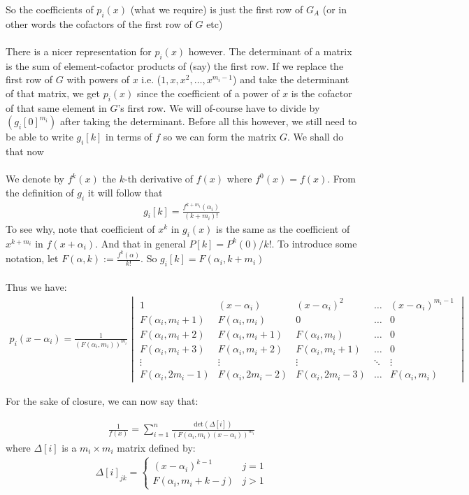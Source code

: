 \documentclass{article}
\begin{document}
So the coefficients of $p_i(x)$ (what we require) is just the first row of $G_A$ (or in other words the cofactors of the first row of $G$ etc) 
\\\\
There is a nicer representation for $p_i(x)$ however. The determinant of a matrix is the sum of element-cofactor products of (say) the first row. If we replace the first row of $G$ with powers of $x$ i.e. ($1,x,x^2,\dots,x^{m_i-1}$) and take the determinant of that matrix, we get $p_i(x)$ since the coefficient of a power of $x$ is the cofactor of that same element in $G$'s first row. We will of-course have to divide by $(g_i[0]^{m_i})$ after taking the determinant. Before all this however, we still need to be able to write $g_i[k]$ in terms of $f$ so we can form the matrix $G$. We shall do that now
\\\\
We denote by $f^k(x)$ the $k$-th derivative of $f(x)$ where $f^0(x) = f(x)$. From the definition of $g_i$ it will follow that
\begin{align}
    g_i[k] = \frac{f^{k+m_i}(\alpha_i)}{(k+m_i)!}
\end{align}
To see why, note that coefficient of $x^k$ in $g_i(x)$ is the same as the coefficient of $x^{k+m_i}$ in $f(x+\alpha_i)$. And that in general $P[k] = P^k(0)/k!$. To introduce some notation, let $F(\alpha, k) := \frac{f^k(\alpha)}{k!}$. So $g_i[k] = F(\alpha_i, k+m_i)$
\\\\
Thus we have:
\begin{align}
    p_i(x-\alpha_i) = \frac{1}{(F(\alpha_i, m_i))^{m_i}}\begin{vmatrix}
    1 & (x-\alpha_i) & (x-\alpha_i)^2 &  \dots  & (x-\alpha_i)^{m_i-1} \\
    F(\alpha_i, m_i+1) & F(\alpha_i, m_i) & 0 &\dots  & 0 \\
    F(\alpha_i, m_i+2) & F(\alpha_i, m_i+1) & F(\alpha_i, m_i) & \dots  & 0 \\
    F(\alpha_i, m_i+3) & F(\alpha_i, m_i+2) & F(\alpha_i, m_i+1)  & \dots  & 0 \\
    \vdots & \vdots & \vdots & \ddots & \vdots \\
    F(\alpha_i, 2 m_i-1) & F(\alpha_i, 2 m_i-2) & F(\alpha_i, 2 m_i-3) & \dots  & F(\alpha_i, m_i)
\end{vmatrix}
\end{align}

For the sake of closure, we can now say that:
\begin{tcolorbox}
\begin{align}
    \frac{1}{f(x)} = \sum_{i=1}^{n} \frac{\textrm{det}(\Delta[i])}{\left(F(\alpha_i, m_i)(x-\alpha_i)\right)^{m_i}} \label{repeated}
\end{align}
where $\Delta[i]$ is a $m_i \times m_i$ matrix defined by:
\begin{align}
    \Delta[i]_{jk} = \begin{cases}(x-\alpha_i)^{k-1} & j = 1 \\ F(\alpha_i, m_i + k - j) & j>1\end{cases} \nonumber
\end{align}
\end{tcolorbox}
\end{document}
